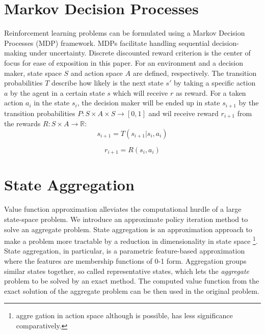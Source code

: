 \documentclass{article}
\begin{document}
    \section{Markov Decision Processes}
    Reinforcement learning problems can be formulated using a Markov Decision Processes (MDP)
    framework\cite{Puterman1994, Bertsekas}.
    MDPs facilitate handling sequential decision-making under uncertainty.
    Discrete discounted reward criterion is the center of focus for ease of exposition in this paper.
    For an environment and a decision maker, state space $S$ and action space $A$ are defined, respectively.
    The transition probabilities $T$ describe how likely is the next state $s'$ by taking a specific action $a$ by
    the agent in a certain state $s$ which will receive $r$ as reward.
    For a taken action $a_i$ in the state $s_i$, the decision maker will be ended up in state $s_{i+1}$ by the
    transition probabilities $P : S \times A \times S \rightarrow [0, 1]$ and wil receive reward $r_{i+1}$ from the
    rewards $R : S \times A \rightarrow \mathbb{R}$: \\
    \begin{equation}
        s_{i+1} = T(s_{i+1}|s_i, a_i)
    \end{equation}

    \begin{equation}
        r_{i+1} = R(s_i, a_i)
    \end{equation}


    \section{State Aggregation}
    Value function approximation alleviates the computational hurdle of a large state-space problem.
    We introduce an approximate policy iteration method to solve an aggregate problem.
    State aggregation is an approximation approach to make a problem more tractable by a reduction in dimensionality in
    state space \footnote{aggre
    gation in action space although is possible, has less significance comparatively.}.
    State aggregation, in particular, is a parametric feature-based approximation where the features are membership
    functions of 0-1 form.
    Aggregation groups similar states together, so called representative states, which lets the \textit{aggregate}
    problem to be solved by an exact method.
    The computed value function from the exact solution of the aggregate problem can be then used in the original
    problem.
\end{document}
